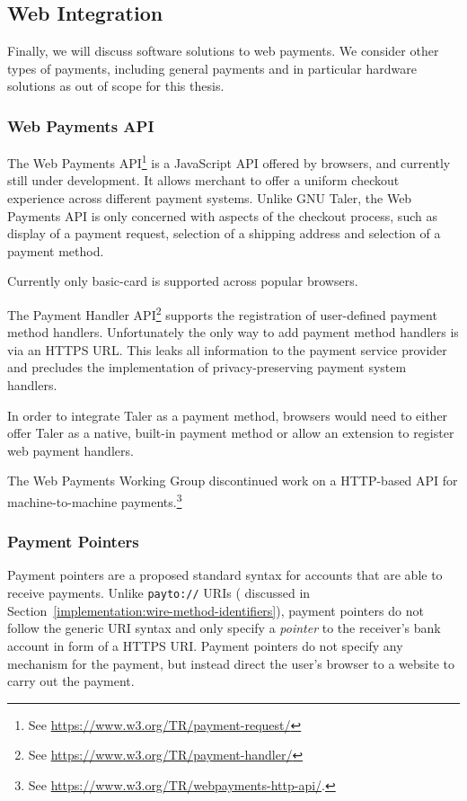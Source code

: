 \subsection{Web Integration}

Finally, we will discuss software solutions to web payments.  We
consider other types of payments, including general payments and in
particular hardware solutions as out of scope for this thesis.

\subsubsection{Web Payments API}
The Web Payments API\footnote{See \url{https://www.w3.org/TR/payment-request/}}
is a JavaScript API offered by browsers, and currently still under development.
It allows merchant to offer a uniform checkout experience across different
payment systems.  Unlike GNU Taler, the Web Payments API is only concerned with
aspects of the checkout process, such as display of a payment request,
selection of a shipping address and selection of a payment method.

Currently only basic-card is supported across popular browsers.

The Payment Handler API\footnote{See
\url{https://www.w3.org/TR/payment-handler/}} supports the registration of
user-defined payment method handlers.  Unfortunately the only way to add
payment method handlers is via an HTTPS URL.  This leaks all information to the
payment service provider and precludes the implementation of privacy-preserving
payment system handlers.

In order to integrate Taler as a payment method, browsers would need to either
offer Taler as a native, built-in payment method or allow an extension to
register web payment handlers.


The Web Payments Working Group discontinued work on a HTTP-based API for
machine-to-machine payments.\footnote{See
\url{https://www.w3.org/TR/webpayments-http-api/}.}

\subsubsection{Payment Pointers}
Payment pointers are a proposed standard syntax for accounts that are able to
receive payments.  Unlike \texttt{payto://} URIs ( discussed in
Section~\ref{implementation:wire-method-identifiers}), payment pointers do not
follow the generic URI syntax and only specify a \emph{pointer} to the
receiver's bank account in form of a HTTPS URI.  Payment pointers do not
specify any mechanism for the payment, but instead direct the user's browser to
a website to carry out the payment.


